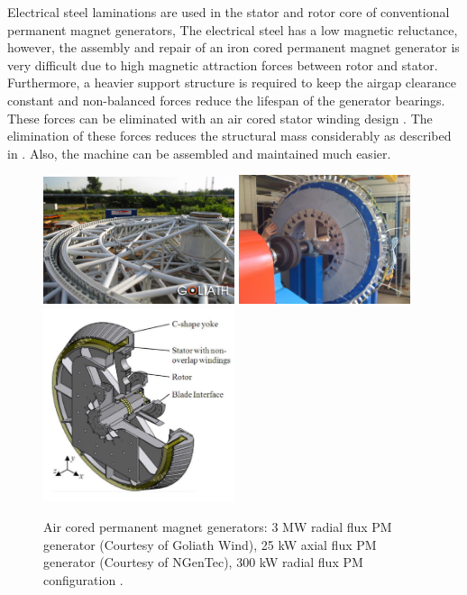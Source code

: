 \documentclass[a4paper, 11pt]{article} %
\begin{document}
Electrical steel laminations are used in the stator and rotor core of conventional permanent magnet generators, The electrical steel has a low magnetic reluctance, however, the assembly and repair of an iron cored permanent magnet generator is very difficult due to high magnetic attraction forces between rotor and stator. Furthermore, a heavier support structure is required to keep the airgap clearance constant and non-balanced forces reduce the lifespan of the generator bearings. These forces can be eliminated with an air cored stator winding design \cite{Mueller2009}. The elimination of these forces reduces the structural mass considerably as described in \cite{McDonald2008b}. Also, the machine can be assembled and maintained much easier. 

  \begin{figure}[t]
    \centering
    \includegraphics[width=0.5\textwidth]{goliath}
    \includegraphics[width=0.45\textwidth]{25kw_cgen}
    \includegraphics[width=0.5\textwidth]{c-core_kamper}
    \caption{Air cored permanent magnet generators: 3 MW radial flux PM generator (Courtesy of Goliath Wind), 25 kW axial flux PM generator (Courtesy of NGenTec), 300 kW radial flux PM configuration \cite{Wijk2010}.} 
    \label{air_cored}
  \end{figure}
\end{document}
